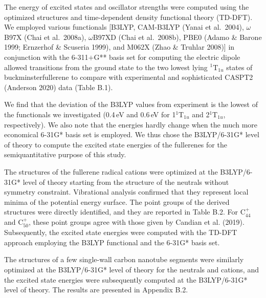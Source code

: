 \documentclass{aa}
\begin{document}
        The energy of excited states and oscillator strengths were computed using the optimized structures and time-dependent density functional theory (TD-DFT). We employed various functionals [B3LYP, CAM-B3LYP (Yanai et al.\ 2004), $\omega$B97X (Chai et al.\ 2008a), $\omega$B97XD (Chai et al.\ 
2008b),  PBE0 (Adamo \& Barone 1999; Ernzerhof \& Scuseria 1999),  and M062X (Zhao \& Truhlar 2008)] in conjunction with the 6-311$+$G** basis set for computing the electric dipole allowed transitions from the ground state to the two lowest lying $^1$T$_{1u}$ states of buckminsterfullerene to 
compare with experimental and sophisticated CASPT2 (Anderson 2020) data (Table B.1). 

We find that the deviation of the B3LYP values from experiment is the lowest of the functionals we investigated (0.4\,eV and 0.6\,eV for 1$^1$T$_{1u}$  and  2$^1$T$_{1u}$, respectively). We also note that the energies hardly change when the much more economical 6-31G* basis set is employed. We thus chose the B3LYP/6-31G* level of theory to compute the excited 
state energies of the fullerenes for the semiquantitative purpose of this study.

        The structures of the fullerene radical cations were optimized at the B3LYP/6-31G* level of theory starting from the structure of the neutrals without symmetry constraint.  
Vibrational analysis confirmed that they represent local minima of the potential energy surface. The point groups of the derived structures were directly identified, and they are  reported in Table B.2.  For C$_{44}^+$ and C$_{50}^+$, these point groups agree with those given by Candian et al. (2019).
Subsequently, the excited state energies were computed with the TD-DFT approach employing the B3LYP functional and the 6-31G* basis set.

        The structures of a few single-wall carbon nanotube segments were similarly optimized at the B3LYP/6-31G* level of theory for the neutrals and cations, and the excited state energies were subsequently computed at the B3LYP/6-31G* level of theory. The results are presented in Appendix B.2.
\end{document}
